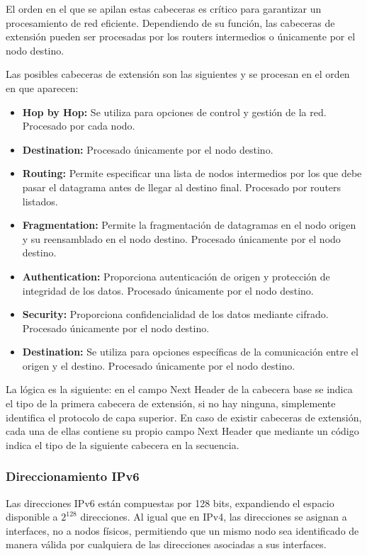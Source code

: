 El orden en el que se apilan estas cabeceras es crítico para garantizar un procesamiento de red eficiente. Dependiendo de su función, las cabeceras de extensión pueden ser procesadas por los routers intermedios o únicamente por el nodo destino.

Las posibles cabeceras de extensión son las siguientes y se procesan en el orden en que aparecen:
\begin{itemize}
    \item \textbf{Hop by Hop:} Se utiliza para opciones de control y gestión de la red. Procesado por cada nodo.
    \item \textbf{Destination:} Procesado únicamente por el nodo destino.
    \item \textbf{Routing:} Permite especificar una lista de nodos intermedios por los que debe pasar el datagrama antes de llegar al destino final. Procesado por routers listados.
    \item \textbf{Fragmentation:} Permite la fragmentación de datagramas en el nodo origen y su reensamblado en el nodo destino. Procesado únicamente por el nodo destino.
    \item \textbf{Authentication:} Proporciona autenticación de origen y protección de integridad de los datos. Procesado únicamente por el nodo destino.
    \item \textbf{Security:} Proporciona confidencialidad de los datos mediante cifrado. Procesado únicamente por el nodo destino.
    \item \textbf{Destination:} Se utiliza para opciones específicas de la comunicación entre el origen y el destino. Procesado únicamente por el nodo destino.
\end{itemize}

La lógica es la siguiente: en el campo Next Header de la cabecera base se indica el tipo de la primera cabecera de extensión, si no hay ninguna, simplemente identifica el protocolo de capa superior. En caso de existir cabeceras de extensión, cada una de ellas contiene su propio campo Next Header que mediante un código indica el tipo de la siguiente cabecera en la secuencia.

\subsubsection{Direccionamiento IPv6}
Las direcciones IPv6 están compuestas por 128 bits, expandiendo el espacio disponible a $2^{128}$ direcciones. Al igual que en IPv4, las direcciones se asignan a interfaces, no a nodos físicos, permitiendo que un mismo nodo sea identificado de manera válida por cualquiera de las direcciones asociadas a sus interfaces.

